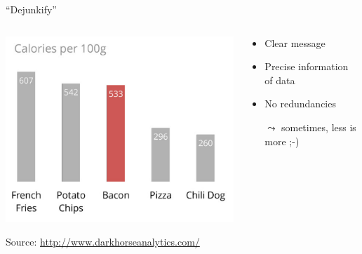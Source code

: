 \documentclass[aspectratio=169]{../latex_main/tntbeamer}  %
\begin{document}
	\begin{frame}{``Dejunkify''}

        \begin{columns}
            \begin{column}{0.5\textwidth}
                \vspace{-2em}
                \includegraphics[width=1\textwidth]{./figure/good_figure.png}        
                
                {
                \footnotesize
                Source: \url{http://www.darkhorseanalytics.com/}
                }
                
            \end{column}
        
            \begin{column}{0.5\textwidth}
            
            \begin{itemize}
                \item Clear message
                \item Precise information of data
                \item No redundancies
                \item[$\leadsto$] sometimes, less is more ;-)
            \end{itemize}
            
            \end{column}
            
        \end{columns}
	    
	\end{frame}
	
\end{document}

